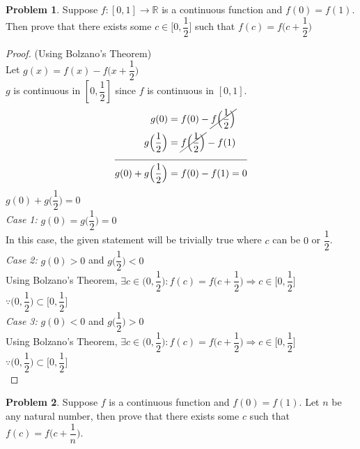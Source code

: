 \documentclass[14]{article}
\theoremstyle{definition}
\newtheorem{prob}{Problem}
\theoremstyle{case}
\begin{document}
\begin{prob}
Suppose $f:[0, 1] \to \mathbb{R}$ is a continuous function and $f(0) = f(1)$. Then prove that there exists some $c \in \Big[0, \dfrac{1}{2}\Big]$ such that $f(c) = f\Big(c + \dfrac{1}{2}\Big)$
\begin{proof} (Using Bolzano's Theorem)\\
Let $g(x) = f(x) - f\Big(x + \dfrac{1}{2}\Big)$\\
$g$ is continuous in $\left[ 0, \dfrac12 \right]$ since $f$ is continuous in $[0, 1]$.\\
\begin{align}
g(0) &= f(0) - \cancel{f\Big(\dfrac{1}{2}\Big)}\\
g\Big(\dfrac{1}{2}\Big) &= \cancel{f\Big(\dfrac{1}{2}\Big)} - f(1)\\
\cline{1-2}
g(0)+g\Big(\dfrac{1}{2}\Big) &= f(0) - f(1) = 0
\end{align}
$g(0)+g\Big(\dfrac{1}{2}\Big) = 0$\\
\textit{Case 1:} $g(0)=g\Big(\dfrac{1}{2}\Big) = 0$\\
In this case, the given statement will be trivially true where $c$ can be $0$ or $\dfrac{1}{2}$.\\
\textit{Case 2:} $g(0) > 0$ and $g\Big(\dfrac{1}{2}\Big) < 0$\\
Using Bolzano's Theorem, $\exists c \in \Big(0, \dfrac{1}{2}\Big) : f(c) = f\Big(c + \dfrac{1}{2}\Big) \Rightarrow c \in \Big[0, \dfrac{1}{2}\Big]\;\;\;\;\;\;\;\;\;\;$ $\because \Big(0, \dfrac{1}{2}\Big) \subset \Big[0, \dfrac{1}{2}\Big] $\\
\textit{Case 3:} $g(0) < 0$ and $g\Big(\dfrac{1}{2}\Big) > 0$\\
Using Bolzano's Theorem, $\exists c \in \Big(0, \dfrac{1}{2}\Big) : f(c) = f\Big(c + \dfrac{1}{2}\Big) \Rightarrow c \in \Big[0, \dfrac{1}{2}\Big]\;\;\;\;\;\;\;\;\;\;$ $\because \Big(0, \dfrac{1}{2}\Big) \subset \Big[0, \dfrac{1}{2}\Big] $\\
\end{proof}
\end{prob}
\pagebreak
\begin{prob}
Suppose $f$ is a continuous function and $f(0) = f(1)$. Let $n$ be any natural number, then prove that there exists some $c$ such that $f(c) = f\Big(c + \dfrac{1}{n}\Big)$.
\end{prob}
\end{document}
